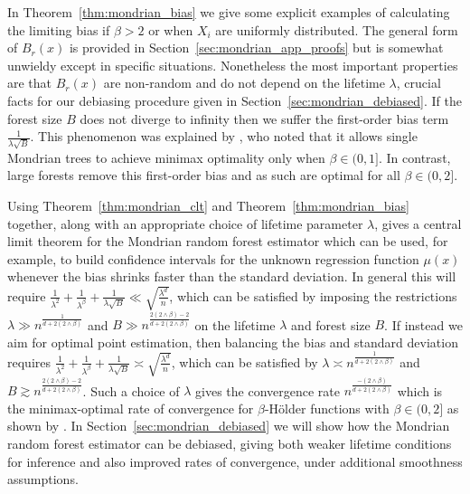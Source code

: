 In Theorem~\ref{thm:mondrian_bias} we give some explicit examples of
calculating the
limiting bias if $\beta > 2$ or when $X_i$ are uniformly distributed. The
general form of $B_r(x)$ is provided in Section~\ref{sec:mondrian_app_proofs}
but
is somewhat unwieldy except in specific situations. Nonetheless the most
important properties are that $B_r(x)$ are non-random and do not depend on the
lifetime $\lambda$, crucial facts for our debiasing procedure given in
Section~\ref{sec:mondrian_debiased}. If the forest size $B$ does not diverge to
infinity
then we suffer the first-order bias term $\frac{1}{\lambda \sqrt B}$. This
phenomenon was explained by \citet{mourtada2020minimax}, who noted that it
allows single Mondrian trees to achieve minimax optimality only when
$\beta \in (0, 1]$. In contrast, large forests remove this first-order bias
and as such are optimal for all $\beta \in (0, 2]$.

Using Theorem~\ref{thm:mondrian_clt} and Theorem~\ref{thm:mondrian_bias}
together,
along with an appropriate choice of lifetime parameter $\lambda$,
gives a central limit theorem for the Mondrian random forest estimator
which can be used, for example, to build confidence intervals
for the unknown regression function $\mu(x)$
whenever the bias shrinks faster than the standard deviation.
In general this will require
$\frac{1}{\lambda^2} + \frac{1}{\lambda^\beta} + \frac{1}{\lambda \sqrt B}
\ll \sqrt{\frac{\lambda^d}{n}}$,
which can be satisfied by imposing the restrictions
$\lambda \gg n^{\frac{1}{d + 2(2 \wedge \beta)}}$
and $B \gg n^{\frac{2(2 \wedge \beta) - 2}{d + 2(2 \wedge \beta)}}$
on the lifetime $\lambda$ and forest size $B$.
If instead we aim for optimal point estimation,
then balancing the bias and standard deviation requires
$\frac{1}{\lambda^2} + \frac{1}{\lambda^\beta} + \frac{1}{\lambda \sqrt B}
\asymp \sqrt{\frac{\lambda^d}{n}}$,
which can be satisfied by
$\lambda \asymp n^{\frac{1}{d + 2(2 \wedge \beta)}}$
and $B \gtrsim n^{\frac{2(2 \wedge \beta) - 2}{d + 2(2 \wedge \beta)}}$.
Such a choice of $\lambda$ gives the convergence rate
$n^{\frac{-(2 \wedge \beta)}{d + 2(2 \wedge \beta)}}$
which is the minimax-optimal rate of convergence \citep{stone1982optimal}
for $\beta$-H{\"o}lder functions with $\beta \in (0,2]$
as shown by \citet[Theorem~2]{mourtada2020minimax}.
In Section~\ref{sec:mondrian_debiased} we will show how the Mondrian random
forest
estimator can be debiased, giving both weaker lifetime conditions for inference
and also improved rates of convergence, under additional smoothness assumptions.

